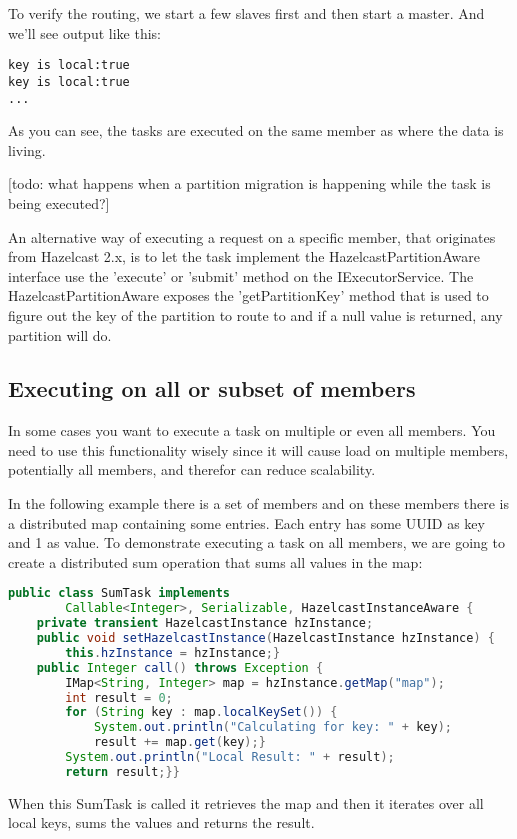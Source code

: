 To verify the routing, we start a few slaves first and then start a master. And we'll see output like this:
\begin{lstlisting}
key is local:true
key is local:true
...
\end{lstlisting}
As you can see, the tasks are executed on the same member as where the data is living.

[todo: what happens when a partition migration is happening while the task is being executed?]

An alternative way of executing a request on a specific member, that originates from Hazelcast 2.x, is to let the task implement the HazelcastPartitionAware interface use the  'execute' or 'submit' method on the IExecutorService. The HazelcastPartitionAware exposes the 'getPartitionKey' method that is used to figure out the key of the partition to route to and if a null value is returned, any partition will do.

\subsection{Executing on all or subset of members}
In some cases you want to execute a task on multiple or even all members. You need to use this functionality wisely since it will cause load on multiple members, potentially all members, and therefor can reduce scalability.

In the following example there is a set of members and on these members there is a distributed map containing some entries. Each entry has some UUID as key and 1 as value. To demonstrate executing a task on all members, we are going to create a distributed sum operation that sums all values in the map:
\begin{lstlisting}[language=java]
public class SumTask implements
        Callable<Integer>, Serializable, HazelcastInstanceAware {
    private transient HazelcastInstance hzInstance;
    public void setHazelcastInstance(HazelcastInstance hzInstance) {
        this.hzInstance = hzInstance;}
    public Integer call() throws Exception {
        IMap<String, Integer> map = hzInstance.getMap("map");
        int result = 0;
        for (String key : map.localKeySet()) {
            System.out.println("Calculating for key: " + key);
            result += map.get(key);}
        System.out.println("Local Result: " + result);
        return result;}}
\end{lstlisting}
When this SumTask is called it retrieves the map and then it iterates over all local keys, sums the values and returns the result.

